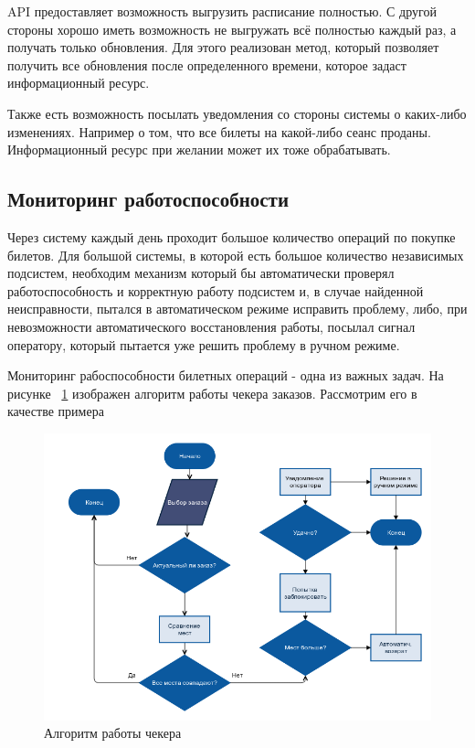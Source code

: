 API предоставляет возможность выгрузить расписание полностью. С другой стороны хорошо иметь возможность не выгружать всё полностью каждый раз, а получать только обновления. Для этого реализован метод, который позволяет получить все обновления после определенного времени, которое задаст информационный ресурс.

Также есть возможность посылать уведомления со стороны системы о каких-либо изменениях. Например о том, что все билеты на какой-либо сеанс проданы. Информационный ресурс при желании может их тоже обрабатывать.

\subsection{Мониторинг работоспособности}

Через систему каждый день проходит большое количество операций по покупке билетов. Для большой системы, в которой есть большое количество независимых подсистем, необходим механизм который бы автоматически проверял работоспособность и корректную работу подсистем и, в случае найденной неисправности, пытался в автоматическом режиме исправить проблему, либо, при невозможности автоматического восстановления работы, посылал сигнал оператору, который пытается уже решить проблему в ручном режиме.

Мониторинг рабоспособности билетных операций - одна из важных задач. На рисунке ~\ref{fig:checker.png} изображен алгоритм работы чекера заказов. Рассмотрим его в качестве примера

\begin{figure}[H]
  	\centering
 	\includegraphics[width=1\textwidth]{images/checker.png}
  	\caption{Алгоритм работы чекера}
    \label{fig:checker.png}
\end{figure}

